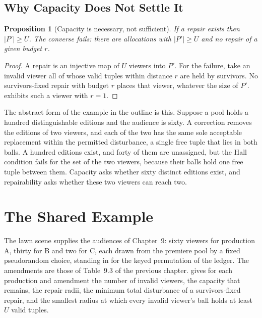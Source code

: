 \documentclass[11pt,twoside,openright]{book}
\theoremstyle{plain}
\newtheorem{proposition}[theorem]{Proposition}
\theoremstyle{definition}
\theoremstyle{remark}
\begin{document}
\subsection{Why Capacity Does Not Settle It}

\begin{proposition}[Capacity is necessary, not sufficient]\label{prop:necessary}
If a repair exists then $\lvert P'\rvert\ge U$. The converse fails: there are allocations with $\lvert P'\rvert\ge U$ and no repair of a given budget $r$.
\end{proposition}

\begin{proof}
A repair is an injective map of $U$ viewers into $P'$. For the failure, take an invalid viewer all of whose valid tuples within distance $r$ are held by survivors. No survivors-fixed repair with budget $r$ places that viewer, whatever the size of $P'$.  exhibits such a viewer with $r=1$.
\end{proof}

The abstract form of the example in the outline is this. Suppose a pool holds a hundred distinguishable editions and the audience is sixty. A correction removes the editions of two viewers, and each of the two has the same sole acceptable replacement within the permitted disturbance, a single free tuple that lies in both balls. A hundred editions exist, and forty of them are unassigned, but the Hall condition fails for the set of the two viewers, because their balls hold one free tuple between them. Capacity asks whether sixty distinct editions exist, and repairability asks whether these two viewers can reach two.

\section{The Shared Example}\label{sec:witness}

The lawn scene supplies the audiences of Chapter~9: sixty viewers for production A, thirty for B and two for C, each drawn from the premiere pool by a fixed pseudorandom choice, standing in for the keyed permutation of the ledger. The amendments are those of Table~9.3 of the previous chapter.  gives for each production and amendment the number of invalid viewers, the capacity that remains, the repair radii, the minimum total disturbance of a survivors-fixed repair, and the smallest radius at which every invalid viewer's ball holds at least $U$ valid tuples.
\end{document}
